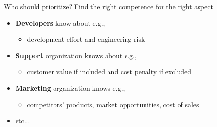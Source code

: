 \begin{Slide}{Who should prioritize?}
Find the right competence for the right aspect
\begin{itemize}
\item \textbf{Developers} know about e.g., 
\begin{itemize}
\item development effort and engineering risk
\end{itemize}
\item \textbf{Support} organization knows about e.g., 
\begin{itemize}
\item customer value if included and cost penalty if excluded
\end{itemize}
\item \textbf{Marketing} organization knows e.g., 
\begin{itemize}
\item competitors' products, market opportunities, cost of sales
\end{itemize}
\item etc...

\end{itemize}
\end{Slide}